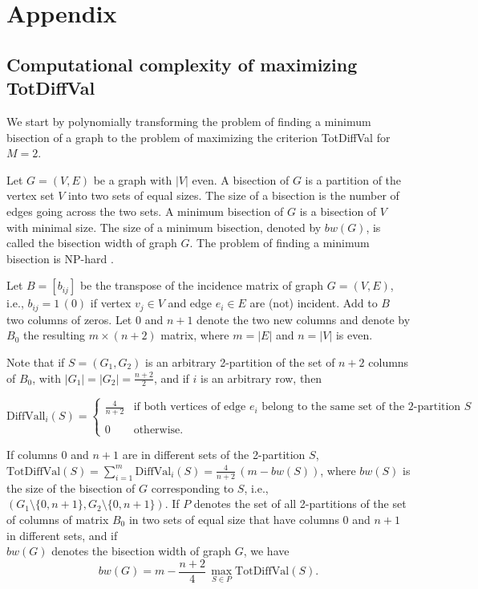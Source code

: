\section{Appendix}\label{appendix}

\subsection{Computational complexity of maximizing TotDiffVal}\label{computational-complexity-of-maximizing-totdiffval}

We start by polynomially transforming the problem of finding a minimum bisection of a graph to the problem of maximizing the criterion TotDiffVal for \(M=2\).

Let \(G=(V,E)\) be a graph with \(|V|\) even. A bisection of \(G\) is a partition of the vertex set \(V\) into two sets of equal sizes. The size of a bisection is the number of edges going across the two sets. A minimum bisection of \(G\) is a bisection of \(V\) with minimal size. The size of a minimum bisection, denoted by \(bw(G)\), is called the bisection width of graph \(G\). The problem of finding a minimum bisection is NP-hard \citep{GJS1976}.

Let \(B=[b_{ij}]\) be the transpose of the incidence matrix of graph \(G=(V,E)\), i.e., \(b_{ij}=1 \, (0)\) if vertex \(v_j\in V\) and edge \(e_i\in E\) are (not) incident. Add to \(B\) two columns of zeros. Let \(0\) and \(n+1\) denote the two new columns and denote by \(B_0\) the resulting \(m \times (n+2)\) matrix, where \(m=|E|\) and \(n=|V|\) is even.

Note that if \(S=(G_1,G_2)\) is an arbitrary 2-partition of the set of \(n+2\) columns of \(B_0\), with \(|G_1|=|G_2|=\frac{n+2}{2}\), and if \(i\) is an arbitrary row, then

\begin{equation*}
\mathrm{DiffVall}_{i}(S)=\left\{\begin{array}{cl}
\frac{4}{n+2}  &\mbox{if  both vertices of edge $e_i$ belong to the same set of the 2-partition $S$} \\ \quad \\
0  &\mbox{otherwise.}     
\end{array}\right.
\end{equation*}

If columns \(0\) and \(n+1\) are in different sets of the 2-partition \(S\), \(\mathrm{TotDiffVal}(S)=\sum_{i=1}^m \mathrm{DiffVal}_{i}(S)=\frac{4}{n+2} \,(m-bw(S))\), where \(bw(S)\) is the size of the bisection of \(G\) corresponding to \(S\), i.e., \((G_1\setminus\{0,n+1\}, G_2\setminus\{0,n+1\})\). If \(P\) denotes the set of all 2-partitions of the set of columns of matrix \(B_0\) in two sets of equal size that have columns \(0\) and \(n+1\) in different sets, and if\\
\(bw(G)\) denotes the bisection width of graph \(G\), we have
\begin{equation}
bw(G)= m-\frac{n+2}{4} \, \max_{S\in P}\mathrm{TotDiffVal}(S).
\label{eq:minbis}
\end{equation}

